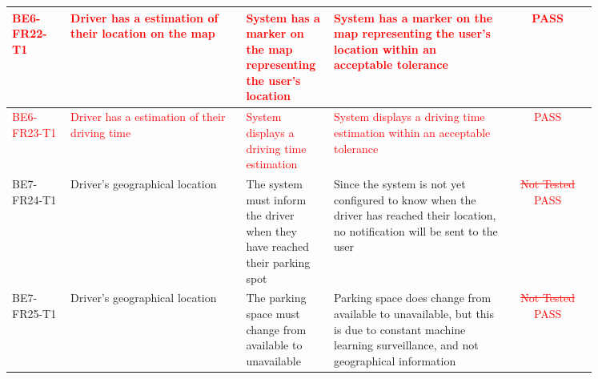 \documentclass[12pt, titlepage]{article}
\begin{document}
\begin{center}
\begin{tabular}{|p{0.10\linewidth}|p{0.30\linewidth}|p{0.15\linewidth}|p{0.30\linewidth}|c|} 
\hline
\textcolor{red}{BE6-FR22-T1} & \textcolor{red}{Driver has a estimation of their
location on the map} & \textcolor{red}{System has a marker on the map
representing the user's location} & \textcolor{red}{System has a marker on the
map representing the user's location within an acceptable tolerance}  &
\textcolor{red}{PASS} \\ 
\hline
\textcolor{red}{BE6-FR23-T1} & \textcolor{red}{Driver has a estimation of their
driving time} & \textcolor{red}{System displays a driving time estimation} &
\textcolor{red}{System displays a driving time estimation within an acceptable
tolerance}  & \textcolor{red}{PASS} \\ 
\hline
BE7-FR24-T1 & Driver’s geographical location & The system must inform the driver
when they have reached their parking spot & Since the system is not yet
configured to know when the driver has reached their location, no notification
will be sent to the user & \textcolor{red}{\st{Not Tested} PASS} \\ 
\hline
BE7-FR25-T1 & Driver’s geographical location & The parking space must change
from available to unavailable & Parking space does change from available to
unavailable, but this is due to constant machine learning surveillance, and not
geographical information & \textcolor{red}{\st{Not Tested} PASS} \\ 
\hline
\end{tabular}
\end{center}
\end{document}
